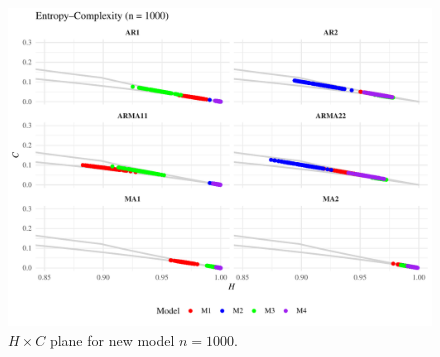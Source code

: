 \documentclass[11pt,a4paper]{article}
\begin{document}
\begin{figure}[H]
	\includegraphics[width=0.8 \textwidth]{New_model_group_plot_n1000}
	\caption{$H \times C$ plane for new model $n=1000$.}
	\label{fig:HC new n1000}
\end{figure}
\end{document}
